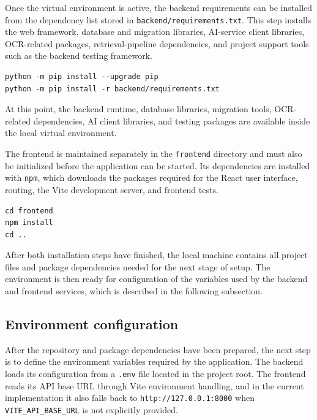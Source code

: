 Once the virtual environment is active, the backend requirements can
be installed from the dependency list stored in
\texttt{backend/requirements.txt}. This step installs the web
framework, database and migration libraries, AI-service client
libraries, OCR-related packages, retrieval-pipeline dependencies, and
project support tools such as the backend testing framework.

\begin{lstlisting}
python -m pip install --upgrade pip
python -m pip install -r backend/requirements.txt
\end{lstlisting}

At this point, the backend runtime, database libraries, migration
tools, OCR-related dependencies, AI client libraries, and testing
packages are available inside the local virtual environment.

The frontend is maintained separately in the \texttt{frontend}
directory and must also be initialized before the application can be
started. Its dependencies are installed with \texttt{npm}, which
downloads the packages required for the React user interface, routing,
the Vite development server, and frontend tests.

\begin{lstlisting}
cd frontend
npm install
cd ..
\end{lstlisting}

After both installation steps have finished, the local machine
contains all project files and package dependencies needed for the
next stage of setup. The environment is then ready for configuration
of the variables used by the backend and frontend services, which is
described in the following subsection.

\subsection{Environment configuration}

After the repository and package dependencies have been prepared, the
next step is to define the environment variables required by the
application. The backend loads its configuration from a
\texttt{.env} file located in the project root. The frontend reads its
API base URL through Vite environment handling, and in the current
implementation it also falls back to
\texttt{http://127.0.0.1:8000} when \texttt{VITE\_API\_BASE\_URL} is
not explicitly provided.

